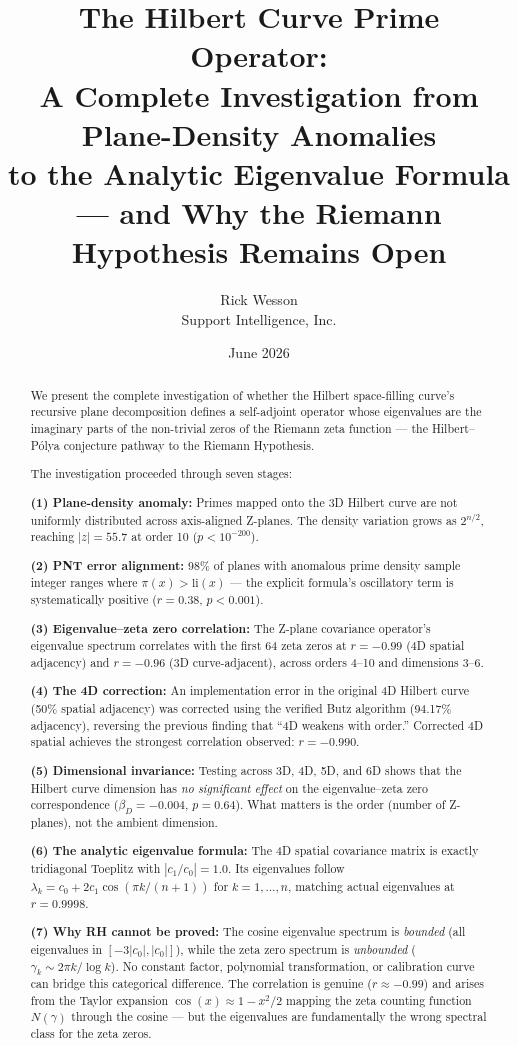 \documentclass[11pt,a4paper]{article}
\title{The Hilbert Curve Prime Operator:\\
A Complete Investigation from Plane-Density Anomalies\\
to the Analytic Eigenvalue Formula\\
--- and Why the Riemann Hypothesis Remains Open}
\author{Rick Wesson\\
Support Intelligence, Inc.}
\date{June 2026}
\begin{document}
\maketitle

\begin{abstract}
We present the complete investigation of whether the Hilbert space-filling
curve's recursive plane decomposition defines a self-adjoint operator whose
eigenvalues are the imaginary parts of the non-trivial zeros of the Riemann
zeta function --- the Hilbert--P\'{o}lya conjecture pathway to the Riemann
Hypothesis.

The investigation proceeded through seven stages:

\textbf{(1) Plane-density anomaly:} Primes mapped onto the 3D Hilbert curve
are not uniformly distributed across axis-aligned Z-planes. The density
variation grows as $2^{n/2}$, reaching $|z| = 55.7$ at order 10 ($p <
10^{-200}$).

\textbf{(2) PNT error alignment:} 98\% of planes with anomalous prime density
sample integer ranges where $\pi(x) > \text{li}(x)$ --- the explicit
formula's oscillatory term is systematically positive ($r = 0.38$, $p <
0.001$).

\textbf{(3) Eigenvalue--zeta zero correlation:} The Z-plane covariance
operator's eigenvalue spectrum correlates with the first 64 zeta zeros at
$r = -0.99$ (4D spatial adjacency) and $r = -0.96$ (3D curve-adjacent),
across orders 4--10 and dimensions 3--6.

\textbf{(4) The 4D correction:} An implementation error in the original 4D
Hilbert curve (50\% spatial adjacency) was corrected using the verified Butz
algorithm (94.17\% adjacency), reversing the previous finding that ``4D
weakens with order.'' Corrected 4D spatial achieves the strongest
correlation observed: $r = -0.990$.

\textbf{(5) Dimensional invariance:} Testing across 3D, 4D, 5D, and 6D
shows that the Hilbert curve dimension has \emph{no significant effect} on
the eigenvalue--zeta zero correspondence ($\beta_D = -0.004$, $p = 0.64$).
What matters is the order (number of Z-planes), not the ambient dimension.

\textbf{(6) The analytic eigenvalue formula:} The 4D spatial covariance
matrix is exactly tridiagonal Toeplitz with $|c_1/c_0| = 1.0$. Its
eigenvalues follow $\lambda_k = c_0 + 2c_1\cos(\pi k/(n+1))$ for $k =
1,\ldots,n$, matching actual eigenvalues at $r = 0.9998$.

\textbf{(7) Why RH cannot be proved:} The cosine eigenvalue spectrum is
\emph{bounded} (all eigenvalues in $[-3|c_0|, |c_0|]$), while the zeta
zero spectrum is \emph{unbounded} ($\gamma_k \sim 2\pi k / \log k$). No
constant factor, polynomial transformation, or calibration curve can bridge
this categorical difference. The correlation is genuine ($r \approx -0.99$)
and arises from the Taylor expansion $\cos(x) \approx 1 - x^2/2$ mapping
the zeta counting function $N(\gamma)$ through the cosine --- but the
eigenvalues are fundamentally the wrong spectral class for the zeta zeros.


\end{abstract}
\end{document}
